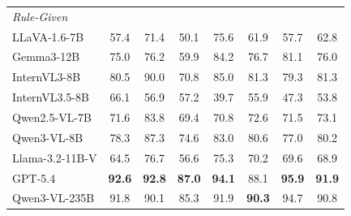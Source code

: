\begin{table}[t]
\begin{tabular}{lccccccc}
\multicolumn{8}{l}{\textit{Rule-Given}} \\
LLaVA-1.6-7B & 57.4 & 71.4 & 50.1 & 75.6 & 61.9 & 57.7 & 62.8 \\
Gemma3-12B & 75.0 & 76.2 & 59.9 & 84.2 & 76.7 & 81.1 & 76.0 \\
InternVL3-8B & 80.5 & 90.0 & 70.8 & 85.0 & 81.3 & 79.3 & 81.3 \\
InternVL3.5-8B & 66.1 & 56.9 & 57.2 & 39.7 & 55.9 & 47.3 & 53.8 \\
Qwen2.5-VL-7B & 71.6 & 83.8 & 69.4 & 70.8 & 72.6 & 71.5 & 73.1 \\
Qwen3-VL-8B & 78.3 & 87.3 & 74.6 & 83.0 & 80.6 & 77.0 & 80.2 \\
Llama-3.2-11B-V & 64.5 & 76.7 & 56.6 & 75.3 & 70.2 & 69.6 & 68.9 \\
GPT-5.4 & \textbf{92.6} & \textbf{92.8} & \textbf{87.0} & \textbf{94.1} & 88.1 & \textbf{95.9} & \textbf{91.9} \\
Qwen3-VL-235B & 91.8 & 90.1 & 85.3 & 91.9 & \textbf{90.3} & 94.7 & 90.8 \\
\bottomrule
\end{tabular}
\end{table}